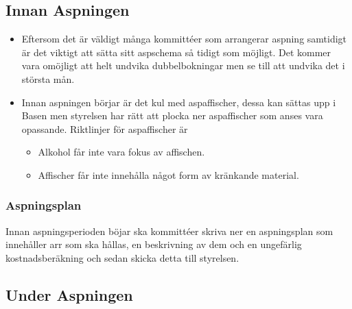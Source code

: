 \documentclass[a4paper]{dtek}
\begin{document}
\subsection{Innan Aspningen}
\begin{itemize}
    \item Eftersom det är väldigt många kommittéer som arrangerar aspning samtidigt är det viktigt att sätta sitt aspschema så tidigt som möjligt. Det kommer vara omöjligt att helt undvika dubbelbokningar men se till att undvika det i största mån. 
    \item Innan aspningen börjar är det kul med aspaffischer, dessa kan sättas upp i Basen men styrelsen har rätt att plocka ner aspaffischer som anses vara opassande. Riktlinjer för aspaffischer är
    \begin{itemize}
        \item Alkohol får inte vara fokus av affischen.
        \item Affischer får inte innehålla något form av kränkande material. 
    \end{itemize}
\end{itemize}
\subsubsection{Aspningsplan}
Innan aspningsperioden böjar ska kommittéer skriva ner en aspningsplan som innehåller arr som ska hållas, en beskrivning av dem och en ungefärlig kostnadsberäkning och sedan skicka detta till styrelsen. 


\subsection{Under Aspningen}
\end{document}
